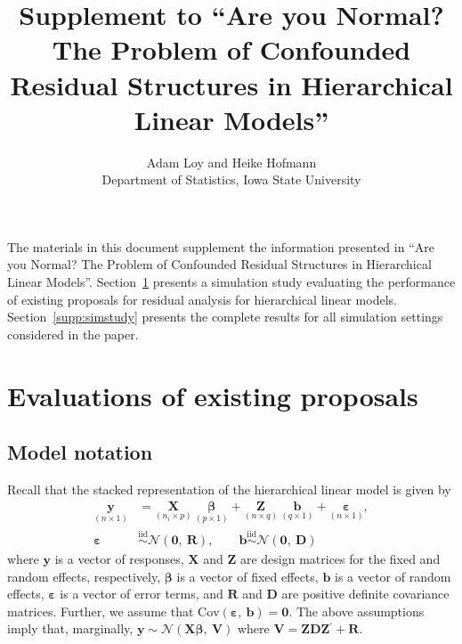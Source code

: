 \documentclass[11pt]{article} %
\newcommand{\trans}{\ensuremath{^\prime}}
\newcommand{\cov}{\ensuremath{\mathrm{Cov}}}
\begin{document}
\title{Supplement to ``Are you Normal? The Problem of Confounded Residual Structures in Hierarchical Linear Models''}
\author{
	Adam Loy and Heike Hofmann\\
	Department of Statistics,
	Iowa State University
}
\maketitle

The materials in this document supplement the information presented in ``Are you Normal? The Problem of Confounded Residual Structures in Hierarchical Linear Models''. Section~\ref{supp:evals} presents a simulation study evaluating the performance of existing proposals for residual analysis for hierarchical linear models. Section~\ref{supp:simstudy} presents the complete results for all simulation settings considered in the paper. 


\section{Evaluations of existing proposals}\label{supp:evals}

\subsection{Model notation}
Recall that the stacked representation of the hierarchical linear model is given by 
%
\begin{align}\label{eq:hlm}
	\underset{(n \times 1)}{\bm{y}} &= \underset{(n_i \times p)}{\bm{X}} \ \underset{(p \times 1)}{\bm{\beta}} + \underset{(n \times q)}{\bm{Z}} \ \underset{(q \times 1)}{\bm{b}} + \underset{(n \times 1)}{\bm{\varepsilon}},\\
	\bm{\varepsilon} & \overset{\text{iid}}{\sim} \mathcal{N}(\bm{0}, \ \bm{R}), \qquad \bm{b} \overset{\text{iid}}{\sim} \mathcal{N}(\bm{0},\ \bm{D}) \nonumber
\end{align}
%
where $\bm{y}$ is a vector of responses, $\bm{X}$ and $\bm{Z}$ are design matrices for the fixed and random effects, respectively, $\bm{\beta}$ is a vector of fixed effects, $\bm{b}$ is a vector of random effects, $\bm{\varepsilon}$ is a vector of error terms, and $\bm{R}$ and $\bm{D}$ are positive definite covariance matrices. Further, we assume that $\cov(\bm{\varepsilon},\ \bm{b}) = \bm{0}$. The above assumptions imply that, marginally, $\bm{y} \sim \mathcal{N}(\bm{X\beta},\ \bm{V})$ where $\bm{V} = \bm{ZDZ}\trans + \bm{R}$.
\end{document}
